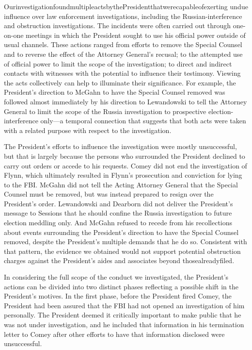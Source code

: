 {OurinvestigationfoundmultipleactsbythePresidentthatwerecapableofexerting undue influence over law enforcement investigations, including the Russian-interference and obstruction investigations.
The incidents were often carried out through one-on-one meetings in which the President sought to use his official power outside of usual channels.
These actions ranged from efforts to remove the Special Counsel and to reverse the effect of the Attorney General's recusal; to the attempted use of official power to limit the scope of the investigation; to direct and indirect contacts with witnesses with the potential to influence their testimony.
Viewing
the acts collectively can help to illuminate their significance.
For example, the President's direction to McGahn to have the Special Counsel removed was followed almost immediately by his direction to Lewandowski to tell the Attorney General to limit the scope of the Russia investigation to prospective election-interference only—a temporal connection that suggests that both acts were taken with a related purpose with respect to the investigation.

The President's efforts to influence the investigation were mostly unsuccessful, but that is largely because the persons who surrounded the President declined to carry out orders or accede to his requests.
Comey did not end the investigation of Flynn, which ultimately resulted in Flynn's prosecution and conviction for lying to the FBI.
McGahn did not tell the Acting Attorney General that the Special Counsel must be removed, but was instead prepared to resign over the President's order.
Lewandowski and Dearborn did not deliver the President's message to Sessions that he should confine the Russia investigation to future election meddling only.
And McGahn refused to recede from his recollections about events surrounding the President's direction to have the Special Counsel removed, despite the President's multiple demands that he do so.
Consistent with that pattern, the evidence we obtained would not support potential obstruction charges against the President's aides and associates beyond thosealreadyfiled.

In considering the full scope of the conduct we investigated, the President's actions can be divided into two distinct phases reflecting a possible shift in the President's motives.
In the first phase, before the President fired Comey, the President had been assured that the FBI had not opened an investigation of him personally.
The President deemed it critically important to make public that he was not under investigation, and he included that information in his termination letter to Comey after other efforts to have that information disclosed were unsuccessful.

}
